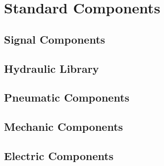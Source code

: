 
\section{Standard Components}\label{app:list_of_components}

\subsection*{Signal Components}

\subsection*{Hydraulic Library}

\subsection*{Pneumatic Components}

\subsection*{Mechanic Components}

\subsection*{Electric Components}

\clearpage
